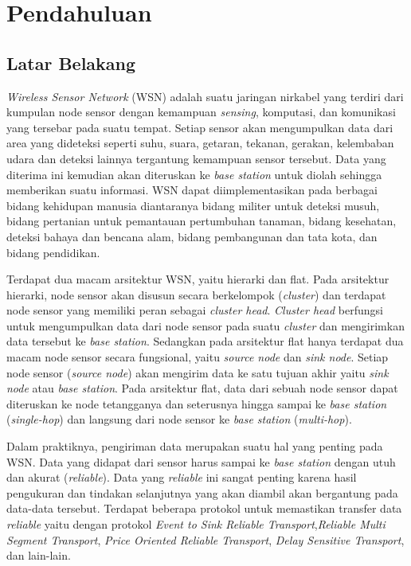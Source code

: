 \chapter{Pendahuluan}
\label{chap:intro}
   
\section{Latar Belakang}
\label{sec:label}

\textit{Wireless Sensor Network} (WSN) adalah suatu jaringan nirkabel yang terdiri dari kumpulan node sensor dengan kemampuan \textit{sensing}, komputasi, dan komunikasi yang tersebar pada suatu tempat. Setiap sensor akan mengumpulkan data dari area yang dideteksi seperti suhu, suara, getaran, tekanan, gerakan, kelembaban udara dan deteksi lainnya tergantung kemampuan sensor tersebut. Data yang diterima ini kemudian akan diteruskan ke \textit{base station} untuk diolah sehingga memberikan suatu informasi. WSN dapat diimplementasikan pada berbagai bidang kehidupan manusia diantaranya bidang militer untuk deteksi musuh, bidang pertanian untuk pemantauan pertumbuhan tanaman, bidang kesehatan, deteksi bahaya dan bencana alam, bidang pembangunan dan tata kota, dan bidang pendidikan.

Terdapat dua macam arsitektur WSN, yaitu hierarki dan flat. Pada arsitektur hierarki, node sensor akan disusun secara berkelompok (\textit{cluster}) dan terdapat node sensor yang memiliki peran sebagai \textit{cluster head}. \textit{Cluster head} berfungsi untuk mengumpulkan data dari node sensor pada suatu \textit{cluster} dan mengirimkan data tersebut ke \textit{base station}. Sedangkan pada arsitektur flat hanya terdapat dua macam node sensor secara fungsional, yaitu \textit{source node} dan \textit{sink node}. Setiap node sensor (\textit{source node}) akan mengirim data ke satu tujuan akhir yaitu \textit{sink node} atau \textit{base station}. Pada arsitektur flat, data dari sebuah node sensor dapat diteruskan ke node tetangganya dan seterusnya hingga sampai ke \textit{base station} (\textit{single-hop}) dan langsung dari node sensor ke \textit{base station} (\textit{multi-hop}).

Dalam praktiknya, pengiriman data merupakan suatu hal yang penting pada WSN. Data yang didapat dari sensor harus sampai ke \textit{base station} dengan utuh dan akurat (\textit{reliable}). Data yang \textit{reliable} ini sangat penting karena hasil pengukuran dan tindakan selanjutnya yang akan diambil akan bergantung pada data-data tersebut. Terdapat beberapa protokol untuk memastikan transfer data \textit{reliable} yaitu dengan protokol \textit{Event to Sink Reliable Transport},\textit{Reliable Multi Segment Transport}, \textit{Price Oriented Reliable Transport}, \textit{Delay Sensitive Transport}, dan lain-lain.

